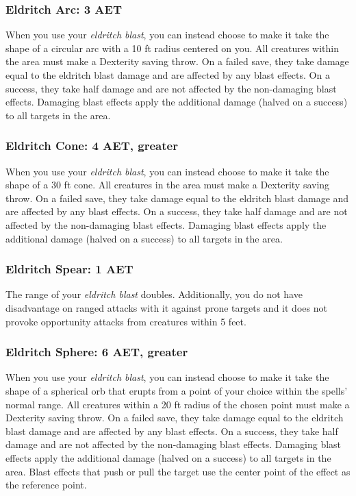 \subsubsection{Eldritch Arc: 3 AET}
When you use your \textit{eldritch blast}, you can instead choose to make it take the shape of a circular arc with a 10 ft radius centered on you. All creatures within the area must make a Dexterity saving throw. On a failed save, they take damage equal to the eldritch blast damage and are affected by any blast effects. On a success, they take half damage and are not affected by the non-damaging blast effects. Damaging blast effects apply the additional damage (halved on a success) to all targets in the area.

\subsubsection{Eldritch Cone: 4 AET, greater}
When you use your \textit{eldritch blast}, you can instead choose to make it take the shape of a 30 ft cone. All creatures in the area must make a Dexterity saving throw. On a failed save, they take damage equal to the eldritch blast damage and are affected by any blast effects. On a success, they take half damage and are not affected by the non-damaging blast effects. Damaging blast effects apply the additional damage (halved on a success) to all targets in the area.

\subsubsection{Eldritch Spear: 1 AET}
The range of your \textit{eldritch blast} doubles. Additionally, you do not have disadvantage on ranged attacks with it against prone targets and it does not provoke opportunity attacks from creatures within 5 feet.

\subsubsection{Eldritch Sphere: 6 AET, greater}
When you use your \textit{eldritch blast}, you can instead choose to make it take the shape of a spherical orb that erupts from a point of your choice within the spells' normal range. All creatures within a 20 ft radius of the chosen point must make a Dexterity saving throw. On a failed save, they take damage equal to the eldritch blast damage and are affected by any blast effects. On a success, they take half damage and are not affected by the non-damaging blast effects. Damaging blast effects apply the additional damage (halved on a success) to all targets in the area. Blast effects that push or pull the target use the center point of the effect as the reference point.

